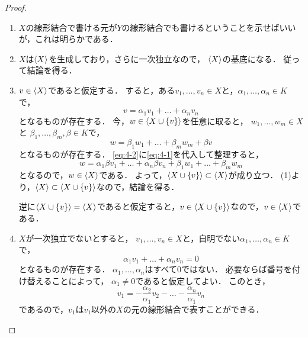 \begin{proof}
  \begin{enumerate}
    \item $X$の線形結合で書ける元が$Y$の線形結合でも書けるということを示せばいいが，これは明らかである．
    \item $X$は$\left\langle X \right\rangle$を生成しており，さらに一次独立なので，
    $\left\langle X \right\rangle$の基底になる．
    従って結論を得る．
    \item $v \in \left\langle X \right\rangle$であると仮定する．
    すると，ある$v_1,\dots,v_n \in X$と，$\alpha_1,\dots,\alpha_n \in K$で，
    \begin{equation}\label{eq:4-1}
      v = \alpha_1 v_1 + \dots + \alpha_n v_n  
    \end{equation}
    となるものが存在する．
    今，$w \in \left\langle X \cup \{v\} \right\rangle$を任意に取ると，
    $w_1,\dots,w_m \in X$と
    $\beta_1,\dots,\beta_m,\beta \in K$で，
    \begin{equation}\label{eq:4-2}
      w = \beta_1 w_1 + \dots + \beta_m w_m + \beta v
    \end{equation}
    となるものが存在する．
    \eqref{eq:4-2}に\eqref{eq:4-1}を代入して整理すると，
    \[
      w = \alpha_1 \beta v_1 + \dots + \alpha_n \beta v_n
      + \beta_1 w_1 + \dots + \beta_m w_m
    \]
    となるので，$w \in \left\langle X \right\rangle$である．
    よって，$\left\langle X \cup \{v\} \right\rangle \subset \left\langle X \right\rangle$が成り立つ．
    (1)より，$\left\langle X \right\rangle \subset \left\langle X \cup \{v\} \right\rangle$なので，結論を得る．

    逆に$\left\langle X\cup\{v\} \right\rangle = \left\langle X \right\rangle$であると仮定すると，$v \in \left\langle X\cup\{v\} \right\rangle$なので，$v \in \left\langle X \right\rangle$である．
    \item $X$が一次独立でないとすると，
    $v_1,\dots,v_n \in X$と，自明でない$\alpha_1,\dots,\alpha_n \in K$で，
    \[
        \alpha_1 v_1 + \dots + \alpha_n v_n = 0
    \]
    となるものが存在する．
    $\alpha_1,\dots,\alpha_n$はすべて0ではない．
    必要ならば番号を付け替えることによって，
    $\alpha_1 \neq 0$であると仮定してよい．
    このとき，
    \[
      v_1 = - \frac{\alpha_2}{\alpha_1} v_2 - \dots - \frac{\alpha_n}{\alpha_1} v_n  
    \]
    であるので，$v_1$は$v_1$以外の$X$の元の線形結合で表すことができる．


\end{enumerate}
\end{proof}
